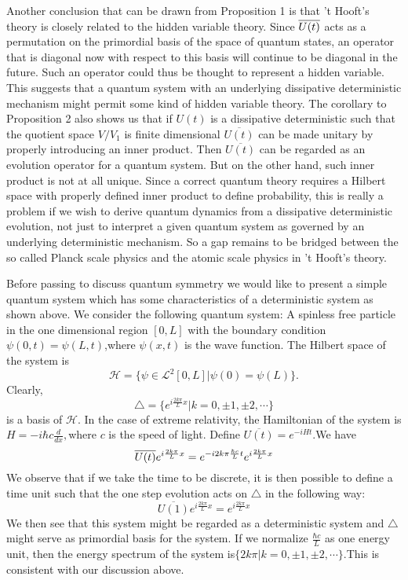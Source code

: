 \documentclass[a4paper,12pt]{article}
\begin{document}
Another conclusion that can be drawn from Proposition 1 is that 't Hooft's
theory is closely related to the hidden variable theory. Since $\overline{%
U(t)}$ acts as a permutation on the primordial basis of the space of quantum
states, an operator that is diagonal now with respect to this basis will
continue to be diagonal in the future. Such an operator could thus be
thought to represent a hidden variable. This suggests that a quantum system
with an underlying dissipative deterministic mechanism might permit some
kind of hidden variable theory. The corollary to Proposition 2 also shows us
that if $U(t)$ is a dissipative deterministic such that the quotient space $%
V/V_1$ is finite dimensional $\overline{U(t)}$ can be made unitary by
properly introducing an inner product. Then $\overline{U(t)}$ can be
regarded as an evolution operator for a quantum system. But on the other
hand, such inner product is not at all unique. Since a correct quantum
theory requires a Hilbert space with properly defined inner product to
define probability, this is really a problem if we wish to derive quantum
dynamics from a dissipative deterministic evolution, not just to interpret a
given quantum system as governed by an underlying deterministic mechanism.
So a gap remains to be bridged between the so called Planck scale physics
and the atomic scale physics in 't Hooft's theory.

Before passing to discuss quantum symmetry we would like to present a simple
quantum system which has some characteristics of a deterministic system as
shown above. We consider the following quantum system: A spinless free
particle in the one dimensional region $[0,L]$ with the boundary condition $%
\psi (0,t)=\psi (L,t)$,where $\psi (x,t)$ is the wave function. The Hilbert
space of the system is
\[
\mathcal{H=}\{\psi \in \mathcal{L}^2[0,L]|\psi (0)=\psi (L)\}.
\]
Clearly,
\[
\triangle =\{e^{i\frac{2k\pi }Lx}|k=0,\pm 1,\pm 2,\cdots \}
\]
is a basis of $\mathcal{H}.$ In the case of extreme relativity, the
Hamiltonian of the system is $H=-i\hbar c\frac d{dx},$where $c$ is the speed
of light. Define $\overline{U(t)}=e^{-iHt}.$We have
\begin{equation}
\overline{U(t)}e^{i\frac{2k\pi }Lx}=e^{-i2k\pi \frac{\hbar c}Lt}e^{i\frac{%
2k\pi }Lx}
\end{equation}
We observe that if we take the time to be discrete, it is then possible to
define a time unit such that the one step evolution acts on $\triangle $ in
the following way:
\[
\overline{U(1)}e^{i\frac{2k\pi }Lx}=e^{i\frac{2k\pi }Lx}
\]
We then see that this system might be regarded as a deterministic system and
$\triangle $ might serve as primordial basis for the system. If we normalize
$\frac{\hbar c}L$ as one energy unit, then the energy spectrum of the system
is$\{2k\pi |k=0,\pm 1,\pm 2,\cdots \}.$This is consistent with our
discussion above.
\end{document}
